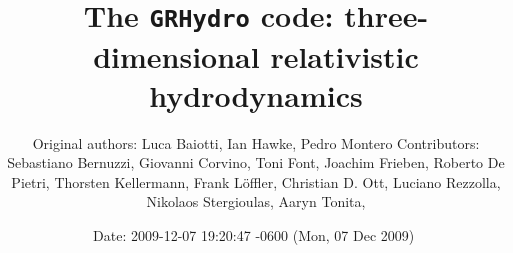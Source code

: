\documentclass{article}
\begin{document}
\title{The {\tt GRHydro} code: three-dimensional relativistic hydrodynamics}

\author{Original authors: Luca Baiotti, Ian Hawke, Pedro Montero \cr Contributors: 
  Sebastiano Bernuzzi, Giovanni Corvino, Toni Font, Joachim Frieben, \cr Roberto De Pietri, Thorsten
  Kellermann, Frank L\"offler, Christian D. Ott, \cr Luciano Rezzolla, Nikolaos Stergioulas, Aaryn
  Tonita,   }

\date{$ $Date: 2009-12-07 19:20:47 -0600 (Mon, 07 Dec 2009) $ $}
\maketitle
\end{document}
